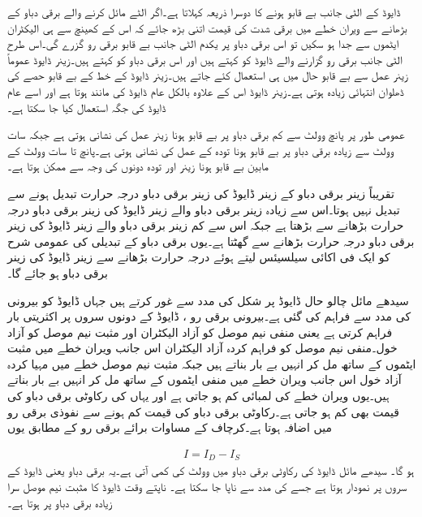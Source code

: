 ڈایوڈ کے الٹی جانب بے قابو ہونے کا دوسرا ذریعہ   کہلاتا ہے۔اگر الٹے مائل کرنے والے برقی دباو کے بڑھانے سے ویران خطے میں برقی شدت کی قیمت اتنی بڑھ جائے کہ اس کے کھینچ سے ہی الیکٹران ایٹموں سے جدا ہو سکیں تو اس برقی دباو پر یکدم الٹی جانب بے قابو برقی رو گزرے گی۔اس طرح الٹی جانب برقی رو گزارنے والے ڈایوڈ کو   کہتے ہیں اور اس برقی دباو   کو   کہتے ہیں۔زینر  ڈایوڈ عموماً زینر عمل سے بے قابو حال میں ہی استعمال کئے جاتے ہیں۔زینر  ڈایوڈ کے خط کے بے قابو حصے کی ڈھلوان  انتہائی زیادہ ہوتی ہے۔زینر  ڈایوڈ اس کے علاوہ بالکل عام  ڈایوڈ کی مانند ہوتا ہے اور اسے عام  ڈایوڈ کی جگہ استعمال کیا جا سکتا ہے۔

عمومی طور پر پانچ وولٹ سے کم برقی دباو پر بے قابو ہونا زینر عمل کی نشانی ہوتی ہے جبکہ سات وولٹ سے زیادہ برقی دباو پر بے قابو ہونا تودہ کے عمل کی نشانی ہوتی ہے۔پانچ تا سات وولٹ کے مابین بے قابو ہونا زینر اور تودہ دونوں کی وجہ سے ممکن ہوتا ہے۔

تقریباً  زینر برقی دباو کے زینر ڈایوڈ کی زینر  برقی دباو درجہ حرارت تبدیل ہونے سے تبدیل نہیں ہوتا۔اس سے زیادہ زینر برقی دباو والے زینر ڈایوڈ کی زینر برقی دباو درجہ حرارت بڑھانے سے بڑھتا ہے جبکہ اس سے کم  زینر برقی دباو والے زینر ڈایوڈ کی زینر برقی دباو درجہ حرارت بڑھانے سے گھٹتا ہے۔یوں  برقی دباو کے تبدیلی کی عمومی شرح کو  ایک فی اکائی سیلسیئس  لیتے ہوئے درجہ حرارت  بڑھانے سے  زینر ڈایوڈ کی زینر برقی دباو  ہو جائے گا۔  

	سیدھے مائل چالو حال ڈایوڈ پر شکل   کی مدد سے غور کرتے ہیں جہاں ڈایوڈ کو بیرونی   کی مدد سے  فراہم کی گئی ہے۔بیرونی برقی رو ، ڈایوڈ کے دونوں سروں پر اکثریتی بار فراہم کرتی ہے یعنی منفی نیم موصل کو آزاد الیکٹران اور مثبت نیم موصل کو آزاد خول۔منفی نیم موصل کو فراہم کردہ آزاد الیکٹران اس جانب ویران خطے میں مثبت ایٹموں کے ساتھ مل کر انہیں بے بار بناتے ہیں جبکہ مثبت نیم موصل خطے میں مہیا کردہ آزاد خول اس جانب ویران خطے میں منفی ایٹموں کے ساتھ مل کر انہیں بے بار بناتے ہیں۔یوں ویران خطے کی لمبائی کم ہو جاتی ہے اور یہاں کی رکاوٹی برقی دباو کی قیمت بھی کم ہو جاتی ہے۔رکاوٹی برقی دباو کی قیمت کم ہونے سے نفوذی برقی رو  میں اضافہ ہوتا ہے۔کرچاف کے مساوات برائے برقی رو کے مطابق یوں

\begin{align} \label{مساوات_ڈایوڈ_رو_برابر_نفوذ_منفی_لبریزی_رو}
I=I_D-I_S
\end{align}
ہو گا۔
	سیدھے مائل ڈایوڈ کی رکاوٹی برقی دباو میں  وولٹ کی کمی آتی ہے۔یہ برقی دباو یعنی  ڈایوڈ کے سروں پر نمودار ہوتا ہے جسے  کی مدد سے ناپا جا سکتا ہے۔ ناپتے وقت ڈایوڈ کا مثبت نیم موصل سرا زیادہ برقی دباو پر ہوتا ہے۔

